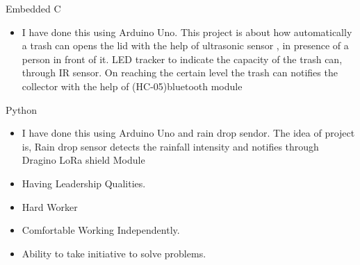 







 {Embedded C}
\begin{itemize}
\item I have done this using Arduino Uno. This project is about how automatically a trash can opens the lid with the help of ultrasonic sensor , in presence of a person in front of it. LED tracker to indicate the capacity of the trash can, through IR sensor. On reaching the certain level the trash can notifies the collector with the help
of (HC-05)bluetooth module
\end{itemize}
\smallskip
\smallskip
{} {Python}
\begin{itemize}
\item I have done this using Arduino Uno and rain drop sendor. The idea of project is, Rain drop sensor detects the rainfall intensity and notifies through Dragino LoRa shield Module
\end{itemize}
\smallskip
\smallskip


\smallskip
\begin{itemize}
\item Having Leadership Qualities.
\smallskip
\item Hard Worker
\smallskip
\item Comfortable Working Independently.
\smallskip
\item Ability to take initiative to solve problems.
\end{itemize}

